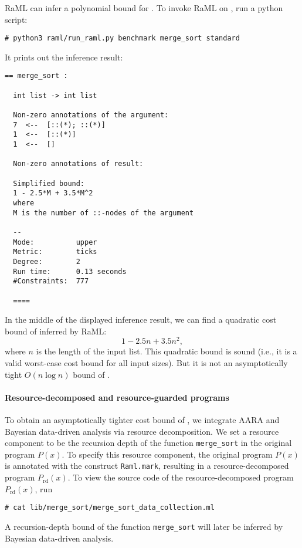 RaML can infer a polynomial bound for \mergesort{}.
%
To invoke RaML on \mergesort{}, run a python script:
\begin{verbatim}
# python3 raml/run_raml.py benchmark merge_sort standard
\end{verbatim}
%
It prints out the inference result:
\begin{Verbatim}[fontsize=\footnotesize]
  == merge_sort :

  int list -> int list

  Non-zero annotations of the argument:
  7  <--  [::(*); ::(*)]
  1  <--  [::(*)]
  1  <--  []

  Non-zero annotations of result:

  Simplified bound:
  1 - 2.5*M + 3.5*M^2
  where
  M is the number of ::-nodes of the argument

  --
  Mode:          upper
  Metric:        ticks
  Degree:        2
  Run time:      0.13 seconds
  #Constraints:  777

  ====
\end{Verbatim}
%
In the middle of the displayed inference result, we can find a quadratic cost
bound of \mergesort{} inferred by RaML:
\begin{equation}
  1 - 2.5 n + 3.5 n^2,
\end{equation}
where $n$ is the length of the input list.
%
This quadratic bound is sound (i.e., it is a valid worst-case cost bound for all
input sizes).
%
But it is not an asymptotically tight $O(n \log n)$ bound of \mergesort{}.

\paragraph{Resource-decomposed and resource-guarded programs}

To obtain an asymptotically tighter cost bound of \mergesort{}, we integrate
AARA and Bayesian data-driven analysis via resource decomposition.
%
We set a resource component to be the recursion depth of the function
\texttt{merge\_sort} in the original program $P(x)$.
%
To specify this resource component, the original program $P(x)$ is annotated
with the construct \texttt{Raml.mark}, resulting in a resource-decomposed
program $P_{\mathrm{rd}}(x)$.
%
To view the source code of the resource-decomposed program $P_{\mathrm{rd}}(x)$,
run
\begin{verbatim}
# cat lib/merge_sort/merge_sort_data_collection.ml
\end{verbatim}
%
A recursion-depth bound of the function \texttt{merge\_sort} will later be
inferred by Bayesian data-driven analysis.

